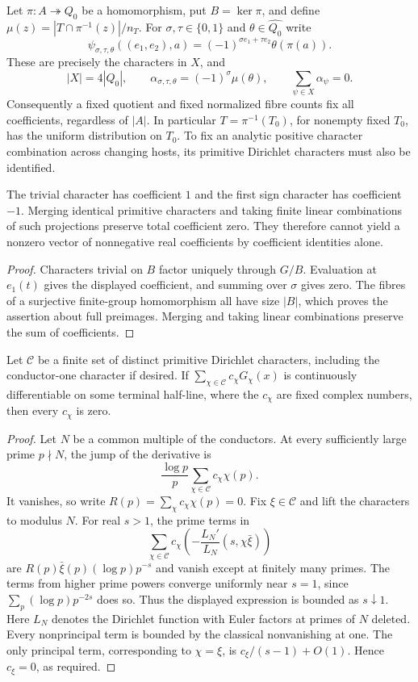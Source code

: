 \begin{lemma}\label{cs-fixed-quotient}
Let $\pi:A\twoheadrightarrow Q_0$ be a homomorphism, put $B=\ker\pi$,
and define $\mu(z)=|T\cap\pi^{-1}(z)|/n_T$. For
$\sigma,\tau\in\{0,1\}$ and $\theta\in\widehat{Q_0}$ write
\[
 \psi_{\sigma,\tau,\theta}((e_1,e_2),a)
    =(-1)^{\sigma e_1+\tau e_2}\theta(\pi(a)).
\]
These are precisely the characters in $X$, and
\[
 |X|=4|Q_0|,\qquad
 \alpha_{\sigma,\tau,\theta}=(-1)^\sigma\widehat\mu(\theta),
 \qquad \sum_{\psi\in X}\alpha_\psi=0.
\]
Consequently a fixed quotient and fixed normalized fibre counts fix all
coefficients, regardless of $|A|$. In particular $T=\pi^{-1}(T_0)$,
for nonempty fixed $T_0$, has the uniform distribution on $T_0$.
To fix an analytic positive character combination across changing hosts,
its primitive Dirichlet characters must also be identified.

The trivial character has coefficient $1$ and the first sign character
has coefficient $-1$. Merging identical primitive characters and taking
finite linear combinations of such projections preserve total coefficient
zero. They therefore cannot yield a nonzero vector of nonnegative real
coefficients by coefficient identities alone.
\end{lemma}
\begin{proof}
Characters trivial on $B$ factor uniquely through $G/B$.
Evaluation at $e_1(t)$ gives the displayed coefficient, and summing over
$\sigma$ gives zero. The fibres of a surjective finite-group homomorphism
all have size $|B|$, which proves the assertion about full preimages.
Merging and taking linear combinations preserve the sum of coefficients.
\end{proof}

\begin{lemma}\label{cs-smoothed-independence}
Let $\mathcal C$ be a finite set of distinct primitive Dirichlet
characters, including the conductor-one character if desired. If
$\sum_{\chi\in\mathcal C}c_\chi G_\chi(x)$ is continuously differentiable
on some terminal half-line, where the $c_\chi$ are fixed complex numbers,
then every $c_\chi$ is zero.
\end{lemma}
\begin{proof}
Let $N$ be a common multiple of the conductors. At every sufficiently
large prime $p\nmid N$, the jump of the derivative is
\[
 \frac{\log p}{p}\sum_{\chi\in\mathcal C}c_\chi\chi(p).
\]
It vanishes, so write $R(p)=\sum_\chi c_\chi\chi(p)=0$.
Fix $\xi\in\mathcal C$ and lift the characters to modulus $N$.
For real $s>1$, the prime terms in
\[
 \sum_{\chi\in\mathcal C}c_\chi
       \left(-\frac{L_N'}{L_N}(s,\chi\bar\xi)\right)
\]
are $R(p)\bar\xi(p)(\log p)p^{-s}$ and vanish except at finitely
many primes. The terms from higher prime powers converge uniformly
near $s=1$, since $\sum_p(\log p)p^{-2s}$ does so.
Thus the displayed expression is bounded as $s\downarrow1$.
Here $L_N$ denotes the Dirichlet function with Euler factors at primes
of $N$ deleted. Every nonprincipal term is bounded by the classical
nonvanishing at one. The only principal term, corresponding to
$\chi=\xi$, is $c_\xi/(s-1)+O(1)$. Hence $c_\xi=0$, as required.
\end{proof}


